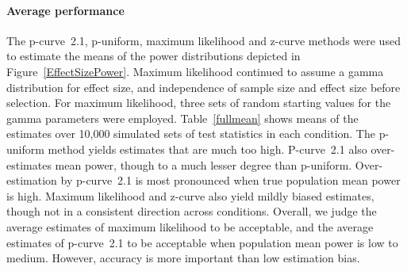 \documentclass[jou]{apa6} %
\begin{document}


\paragraph{Average performance} The p-curve~2.1, p-uniform, maximum likelihood and z-curve methods were used to estimate the means of the power distributions depicted in Figure~\ref{EffectSizePower}. Maximum likelihood continued to assume a gamma distribution for effect size, and independence of sample size and effect size before selection. For maximum likelihood, three sets of random starting values for the gamma parameters were employed. Table~\ref{fullmean} shows means of the estimates over 10,000 simulated sets of test statistics in each condition. The p-uniform method yields estimates that are much too high. P-curve~2.1 also over-estimates mean power, though to a much lesser degree than p-uniform. Over-estimation by p-curve~2.1 is most pronounced when true population mean power is high. Maximum likelihood and z-curve also yield mildly biased estimates, though not in a consistent direction across conditions. Overall, we judge the average estimates of maximum likelihood to be acceptable, and the average estimates of p-curve~2.1 to be acceptable when population mean power is low to medium. However, accuracy is more important than low estimation bias.
\end{document}
